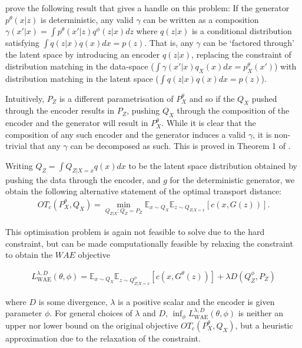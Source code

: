 \cite{tolstikhin} prove the following result that gives a handle on this problem:
If the generator $p^\theta(x|z)$ is deterministic, any valid $\gamma$ can be written as a composition $\gamma(x'|x) = \int p^\theta(x'|z) q^\phi(z|x) dz$ where $q(z|x)$ is a conditional distribution satisfying $\int q(z|x) q(x) dx = p(z)$. 
That is, any $\gamma$ can be `factored through' the latent space by introducing an encoder $q(z|x)$, replacing the constraint of distribution matching in the data-space ($\int \gamma(x'|x) q_X(x) dx = p_X^\theta(x')$) with distribution matching in the latent space ($\int q(z|x) q(x) dx = p(z)$).

Intuitively, $P_Z$ is a different parametrisation of $P_X^\theta$ and so if the $Q_X$ pushed through the encoder results in $P_Z$, pushing $Q_X$ through the composition of the encoder and the generator will result in $P_X^\theta$. 
While it is clear that the composition of any such encoder and the generator induces a valid $\gamma$, it is non-trivial that any $\gamma$ can be decomposed as such. 
This is proved in Theorem 1 of \cite{tolstikhin}.

Writing $Q_Z = \int Q_{Z|X=x} q(x) dx$ to be the latent space distribution obtained by pushing the data through the encoder, and $g$ for the deterministic generator, we obtain the following alternative statement of the optimal transport distance:
%
\begin{align*}
OT_c(P_X^\theta, Q_X) = \min_{Q_{Z|X}: Q_Z = P_Z} \mathbb{E}_{x\sim Q_X} \mathbb{E}_{z\sim Q_{Z|X=x}} \left[ c(x, G(z)) \right].
\end{align*}

This optimisation problem is again not feasible to solve due to the hard constraint, 
but can be made computationally feasible by relaxing the constraint to obtain the $WAE$ objective

\begin{align*}
L_{\text{WAE}}^{\lambda, D}(\theta, \phi) = \mathbb{E}_{x\sim Q_X} \mathbb{E}_{z\sim Q^\phi_{Z|X=x}} \left[ c(x, G^\theta(z)) \right] + \lambda D\left(Q^\phi_Z, P_Z  \right)
\end{align*}

where $D$ is some divergence, $\lambda$ is a positive scalar and the encoder is given parameter $\phi$.
For general choices of $\lambda$ and $D$, $\inf_{\phi} L_{\text{WAE}}^{\lambda, D}(\theta, \phi)$ is neither an upper nor lower bound on the original objective $OT_c(P_X^\theta, Q_X)$, but a heuristic approximation due to the relaxation of the constraint. 

